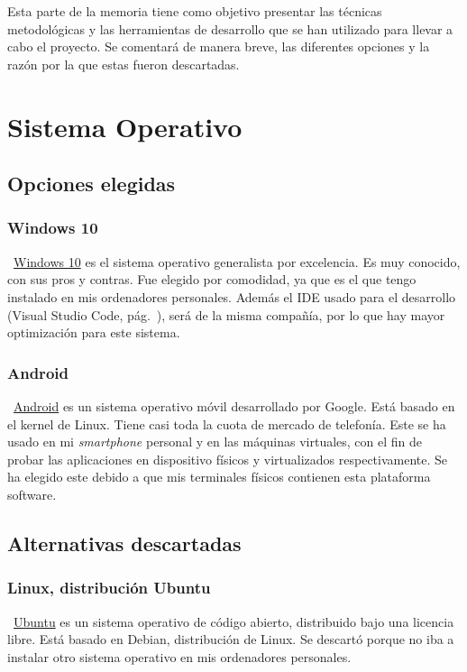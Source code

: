 
Esta parte de la memoria tiene como objetivo presentar las técnicas metodológicas y las herramientas de desarrollo que se han utilizado para llevar a cabo el proyecto. Se comentará de manera breve, las diferentes opciones y la razón por la que estas fueron descartadas.

\section{Sistema Operativo}

\subsection{Opciones elegidas}

\subsubsection{Windows 10}
~\href{https://www.microsoft.com/es-es/software-download/windows10}{Windows 10} es el sistema operativo generalista por excelencia. Es muy conocido, con sus pros y contras. Fue elegido por comodidad, ya que es el que tengo instalado en mis ordenadores personales. Además el IDE usado para el desarrollo (Visual Studio Code, pág.~\pageref{visual}), será de la misma compañía, por lo que hay mayor optimización para este sistema.

\subsubsection{Android}
~\href{https://www.android.com/intl/es_es/}{Android} es un sistema operativo móvil desarrollado por Google. Está basado en el kernel de Linux. Tiene casi toda la cuota de mercado de telefonía. Este se ha usado en mi \emph{smartphone} personal y en las máquinas virtuales, con el fin de probar las aplicaciones en dispositivo físicos y virtualizados respectivamente. Se ha elegido este debido a que mis terminales físicos contienen esta plataforma software.

\subsection{Alternativas descartadas}

\subsubsection{Linux, distribución Ubuntu}
~\href{https://ubuntu.com/}{Ubuntu} es un sistema operativo de código abierto, distribuido bajo una licencia libre. Está basado en Debian, distribución de Linux. Se descartó porque no iba a instalar otro sistema operativo en mis ordenadores personales.

